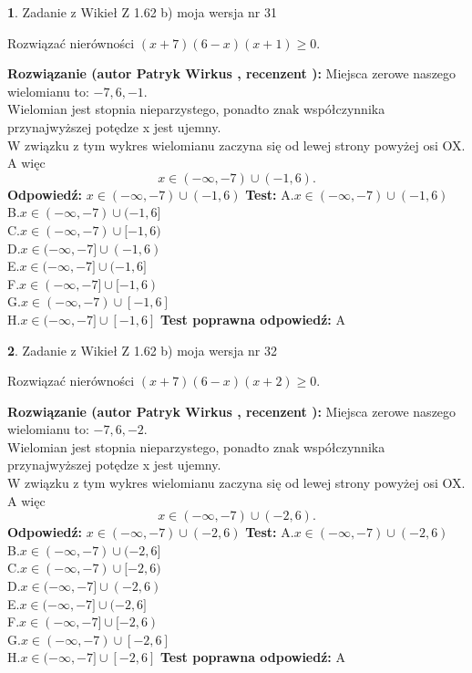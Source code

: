 \documentclass[12pt, a4paper]{article}
\theoremstyle{definition} %
\newtheorem{zad}{}
\newcommand{\zadStart}[1]{\begin{zad}#1\newline}
\newcommand{\zadStop}{\end{zad}}
\newcommand{\rozwStart}[2]{\noindent \textbf{Rozwiązanie (autor #1 , recenzent #2): }\newline}
\newcommand{\rozwStop}{\newline}
\newcommand{\odpStart}{\noindent \textbf{Odpowiedź:}\newline}
\newcommand{\odpStop}{\newline}
\newcommand{\testStart}{\noindent \textbf{Test:}\newline}
\newcommand{\testStop}{\newline}
\newcommand{\kluczStart}{\noindent \textbf{Test poprawna odpowiedź:}\newline}
\newcommand{\kluczStop}{\newline}
\begin{document}
\zadStart{Zadanie z Wikieł Z 1.62 b) moja wersja nr 31}

Rozwiązać nierówności $(x+7)(6-x)(x+1)\ge0$.
\zadStop
\rozwStart{Patryk Wirkus}{}
Miejsca zerowe naszego wielomianu to: $-7, 6, -1$.\\
Wielomian jest stopnia nieparzystego, ponadto znak współczynnika przy\linebreak najwyższej potędze x jest ujemny.\\ W związku z tym wykres wielomianu zaczyna się od lewej strony powyżej osi OX. A więc $$x \in (-\infty,-7) \cup (-1,6).$$
\rozwStop
\odpStart
$x \in (-\infty,-7) \cup (-1,6)$
\odpStop
\testStart
A.$x \in (-\infty,-7) \cup (-1,6)$\\
B.$x \in (-\infty,-7) \cup (-1,6]$\\
C.$x \in (-\infty,-7) \cup [-1,6)$\\
D.$x \in (-\infty,-7] \cup (-1,6)$\\
E.$x \in (-\infty,-7] \cup (-1,6]$\\
F.$x \in (-\infty,-7] \cup [-1,6)$\\
G.$x \in (-\infty,-7) \cup [-1,6]$\\
H.$x \in (-\infty,-7] \cup [-1,6]$
\testStop
\kluczStart
A
\kluczStop



\zadStart{Zadanie z Wikieł Z 1.62 b) moja wersja nr 32}

Rozwiązać nierówności $(x+7)(6-x)(x+2)\ge0$.
\zadStop
\rozwStart{Patryk Wirkus}{}
Miejsca zerowe naszego wielomianu to: $-7, 6, -2$.\\
Wielomian jest stopnia nieparzystego, ponadto znak współczynnika przy\linebreak najwyższej potędze x jest ujemny.\\ W związku z tym wykres wielomianu zaczyna się od lewej strony powyżej osi OX. A więc $$x \in (-\infty,-7) \cup (-2,6).$$
\rozwStop
\odpStart
$x \in (-\infty,-7) \cup (-2,6)$
\odpStop
\testStart
A.$x \in (-\infty,-7) \cup (-2,6)$\\
B.$x \in (-\infty,-7) \cup (-2,6]$\\
C.$x \in (-\infty,-7) \cup [-2,6)$\\
D.$x \in (-\infty,-7] \cup (-2,6)$\\
E.$x \in (-\infty,-7] \cup (-2,6]$\\
F.$x \in (-\infty,-7] \cup [-2,6)$\\
G.$x \in (-\infty,-7) \cup [-2,6]$\\
H.$x \in (-\infty,-7] \cup [-2,6]$
\testStop
\kluczStart
A
\kluczStop
\end{document}
